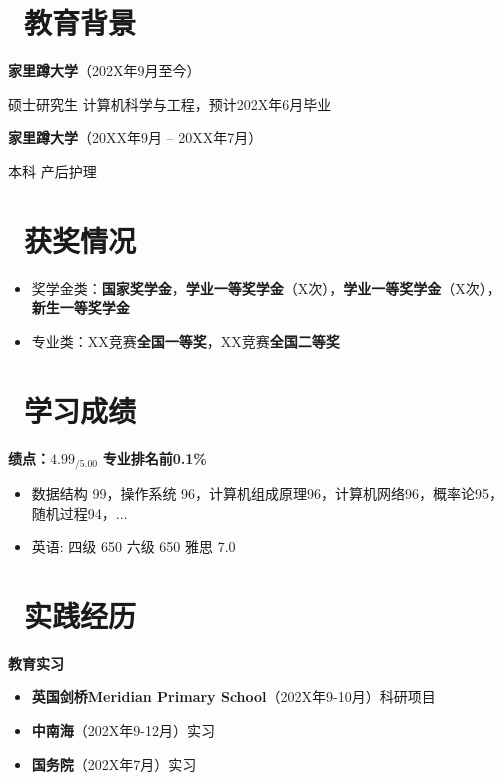 \documentclass[11pt]{article}
\begin{document}
\section{\makebox[\widthof{\faGraduationCap}][c]{\color{CVBlue}\faGraduationCap}\  教育背景}

\textbf{家里蹲大学}（202X年9月至今）

\qquad 硕士研究生 \quad 计算机科学与工程，预计202X年6月毕业

\textbf{家里蹲大学}（20XX年9月 -- 20XX年7月）

\qquad 本科 \quad 产后护理



\section{\makebox[\widthof{\faGraduationCap}][c]{\color{CVBlue}\faTrophy}\ 获奖情况}
\begin{itemize}
	\item 奖学金类：\textbf{国家奖学金}，\textbf{学业一等奖学金}（X次），\textbf{学业一等奖学金}（X次），\textbf{新生一等奖学金}
	\item 专业类：XX竞赛\textbf{全国一等奖}，XX竞赛\textbf{全国二等奖}
	
\end{itemize}


\section{\makebox[\widthof{\faGraduationCap}][c]{\color{CVBlue}\faFileText}\ 学习成绩}
\textbf{绩点：$\mathsf{4.99_{/5.00}}$} \qquad \textbf{专业排名前0.1\%}
\begin{itemize}[parsep=0.5ex]
	\item 数据结构 99，操作系统 96，计算机组成原理96，计算机网络96，概率论95，随机过程94，...
	
	\item 英语: 四级 650 六级 650 雅思 7.0
\end{itemize}


\section{\makebox[\widthof{\faGraduationCap}][c]{\color{CVBlue}\faUniversity}\ 实践经历}
\textbf{教育实习}
\begin{itemize}
	\item \textbf{英国剑桥Meridian Primary School}（202X年9-10月）科研项目
	\item \textbf{中南海}（202X年9-12月）实习
	\item \textbf{国务院}（202X年7月）实习
\end{itemize}
\end{document}
